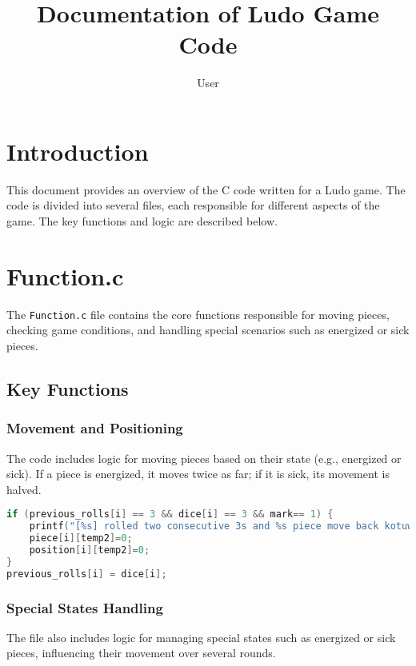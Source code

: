 \documentclass{article}
\title{Documentation of Ludo Game Code}
\author{User}
\begin{document}
\maketitle

\section{Introduction}
This document provides an overview of the C code written for a Ludo game. The code is divided into several files, each responsible for different aspects of the game. The key functions and logic are described below.

\section{Function.c}
The \texttt{Function.c} file contains the core functions responsible for moving pieces, checking game conditions, and handling special scenarios such as energized or sick pieces.

\subsection{Key Functions}

\subsubsection{Movement and Positioning}
The code includes logic for moving pieces based on their state (e.g., energized or sick). If a piece is energized, it moves twice as far; if it is sick, its movement is halved.

\begin{lstlisting}[language=C,caption={Handling Movement in \texttt{Function.c}},label={lst:movement_function}]
if (previous_rolls[i] == 3 && dice[i] == 3 && mark== 1) {
    printf("[%s] rolled two consecutive 3s and %s piece move back kotuwa to base!\\n", player[i],color[i][temp2]);
    piece[i][temp2]=0; 
    position[i][temp2]=0;
}
previous_rolls[i] = dice[i];
\end{lstlisting}

\subsubsection{Special States Handling}
The file also includes logic for managing special states such as energized or sick pieces, influencing their movement over several rounds.
\end{document}
